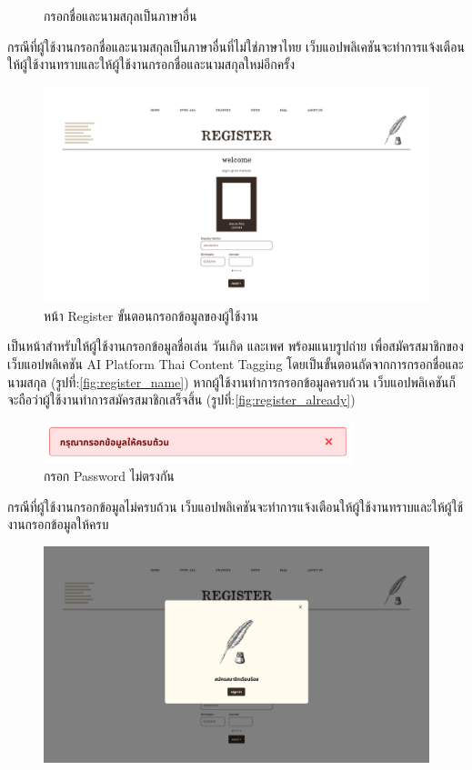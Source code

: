\documentclass[12pt,oneside,openright,a4paper]{cpe-thai-project}
\begin{document}
\begin{itemize}
\begin{figure}[!ht]
  \caption{กรอกชื่อและนามสกุลเป็นภาษาอื่น}\label{fig:worngname} 
\end{figure}
\newline\hspace*{1cm}กรณีที่ผู้ใช้งานกรอกชื่อและนามสกุลเป็นภาษาอื่นที่ไม่ใช่ภาษาไทย เว็บแอปพลิเคชันจะทำการแจ้งเตือนให้ผู้ใช้งานทราบและให้ผู้ใช้งานกรอกชื่อและนามสกุลใหม่อีกครั้ง
\begin{figure}[!ht]\centering
  \includegraphics[width=16cm]{./img/project_ui/7.png} 
  \caption{หน้า Register ขั้นตอนกรอกข้อมูลของผู้ใช้งาน}\label{fig:register_info} 
\end{figure}
\newline\hspace*{1cm}เป็นหน้าสำหรับให้ผู้ใช้งานกรอกข้อมูลชื่อเล่น วันเกิด และเพศ พร้อมแนบรูปถ่าย เพื่อสมัครสมาชิกของเว็บแอปพลิเคชัน AI Platform Thai Content Tagging 
โดยเป็นขั้นตอนถัดจากการกรอกชื่อและนามสกุล (รูปที่:\ref{fig:register_name}) หากผู้ใช้งานทำการกรอกข้อมูลครบถ้วน เว็บแอปพลิเคชันก็จะถือว่าผู้ใช้งานทำการสมัครสมาชิกเสร็จสิ้น (รูปที่:\ref{fig:register_already})
\begin{figure}[!ht]\centering
  \includegraphics[width=9cm]{./img/project_ui/all_inform.png} 
  \caption{กรอก Password ไม่ตรงกัน}\label{fig:all_inform} 
\end{figure}
\newline\hspace*{1cm}กรณีที่ผู้ใช้งานกรอกข้อมูลไม่ครบถ้วน เว็บแอปพลิเคชันจะทำการแจ้งเตือนให้ผู้ใช้งานทราบและให้ผู้ใช้งานกรอกข้อมูลให้ครบ \newpage
\begin{figure}[!ht]\centering
  \includegraphics[width=15cm]{./img/project_ui/regis_ready.png} 

\end{figure}
\end{itemize}
\end{document}
